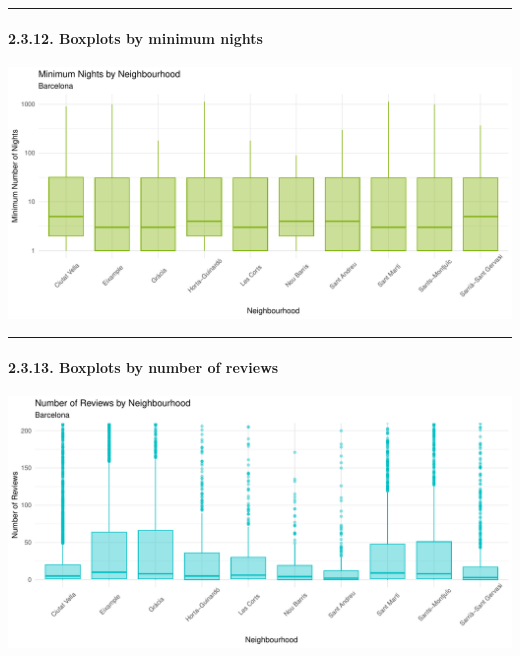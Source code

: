 \documentclass[
]{article}
\begin{document}
\begin{center}\rule{0.5\linewidth}{0.5pt}\end{center}

\hypertarget{boxplots-by-minimum-nights}{%
\paragraph{2.3.12. Boxplots by minimum
nights}\label{boxplots-by-minimum-nights}}

\begin{center}\includegraphics{Barcelona-AirBnB-Insights_files/figure-latex/plot12-1} \end{center}

\begin{center}\rule{0.5\linewidth}{0.5pt}\end{center}

\hypertarget{boxplots-by-number-of-reviews}{%
\paragraph{2.3.13. Boxplots by number of
reviews}\label{boxplots-by-number-of-reviews}}

\begin{center}\includegraphics{Barcelona-AirBnB-Insights_files/figure-latex/plot13-1} \end{center}
\end{document}
